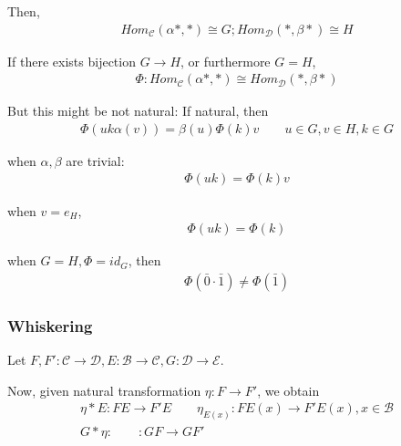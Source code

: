 \documentclass[Total.tex]{subfiles}
\begin{document}
			Then,
			\begin{gather*}
				Hom_\mathcal{C}(\alpha *,*)\cong G;Hom_\mathcal{D}(*,\beta *)\cong H
			\end{gather*}
			
			If there exists bijection $G\rightarrow H$, or furthermore $G=H$, 
			\begin{gather*}
				\Phi:Hom_\mathcal{C}(\alpha*,*)\cong Hom_\mathcal{D}(*,\beta*)
			\end{gather*}
			
			But this might be not natural: If natural, then 
			\begin{gather*}
				\Phi(uk\alpha(v))=\beta(u)\Phi(k)v\qquad u\in G,v\in H,k\in G
			\end{gather*}
			
			when $\alpha,\beta$ are trivial:
			\begin{gather*}
				\Phi(uk)=\Phi(k)v
			\end{gather*}
			
			when $v=e_H$,
			\begin{gather*}
				\Phi(uk)=\Phi(k)
			\end{gather*}
			
			when $G=H,\Phi=id_G$, then 
			\begin{gather*}
				\Phi(\bar{0}\cdot \bar{1})\not=\Phi(\bar{1})
			\end{gather*}
			\subsubsection{Whiskering}
				\begin{Def}
					Let $F,F':\mathcal{C}\rightarrow \mathcal{D},E:\mathcal{B}\rightarrow \mathcal{C},G:\mathcal{D}\rightarrow \mathcal{E}$.
					
					Now, given natural transformation $\eta:F\rightarrow F'$, we obtain
					\begin{gather*}
						\eta*E:FE\rightarrow F'E\qquad \eta_{E(x)}:FE(x)\rightarrow F'E(x),x\in \mathcal{B}\\
						G*\eta:\qquad:GF\rightarrow GF'\qquad 
					\end{gather*}
				\end{Def}
				
				\begin{center}
				\end{center}
\end{document}
